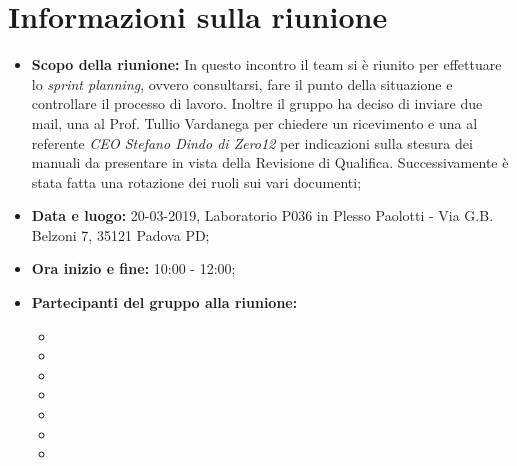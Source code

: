 \clearpage
\section{Informazioni sulla riunione}
\begin{itemize}
	\item \textbf {Scopo della riunione:} In questo incontro il team si è riunito per effettuare lo \textit{sprint planning}, ovvero consultarsi, fare il punto della situazione e controllare il processo di lavoro. Inoltre il gruppo ha deciso di inviare due mail, una al Prof. Tullio Vardanega per chiedere un ricevimento e una al referente \emph{CEO Stefano Dindo di Zero12} per indicazioni sulla stesura dei manuali da presentare in vista della Revisione di Qualifica. Successivamente è stata fatta una rotazione dei ruoli sui vari documenti;
	\item \textbf {Data e luogo:} 20-03-2019, Laboratorio P036 in Plesso Paolotti - Via G.B. Belzoni 7, 35121 Padova PD;
	\item \textbf {Ora inizio e fine:} 10:00 - 12:00;
	\item \textbf {Partecipanti del gruppo alla riunione:} 
		 \begin{itemize}
			\item \sonia
			\item \pardeep
			\item \luca
			\item \matteo
			\item \alberto
			\item \alessandro
			\item \andrea
		\end{itemize}
\end{itemize}